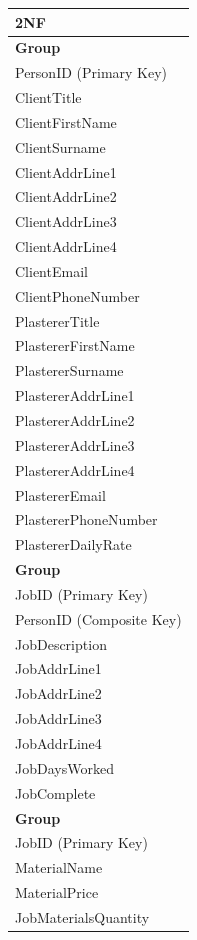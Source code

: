 \begin{flushleft}
    \begin{longtable}{|p{12cm}|}
        \hline
			 \textbf{2NF} \\ \hline
         \textbf{Group} \\ \hline
			PersonID (Primary Key) \\ 
         ClientTitle \\
			ClientFirstName \\
			ClientSurname \\
			ClientAddrLine1 \\
			ClientAddrLine2 \\
			ClientAddrLine3 \\
			ClientAddrLine4 \\
			ClientEmail \\
			ClientPhoneNumber \\
			PlastererTitle \\
			PlastererFirstName \\
			PlastererSurname \\
			PlastererAddrLine1 \\
			PlastererAddrLine2 \\
			PlastererAddrLine3 \\
			PlastererAddrLine4 \\
			PlastererEmail \\
			PlastererPhoneNumber \\
			PlastererDailyRate \\ \hline

			\textbf{Group} \\ \hline
			JobID (Primary Key) \\
			PersonID (Composite Key) \\
         JobDescription \\
			JobAddrLine1 \\
			JobAddrLine2 \\
			JobAddrLine3 \\
			JobAddrLine4 \\
			JobDaysWorked \\
			JobComplete \\ \hline
		
			\textbf{Group} \\ \hline
			JobID (Primary Key) \\ 
			MaterialName \\
			MaterialPrice \\
			JobMaterialsQuantity \\ \hline


\end{longtable}
\end{flushleft}
